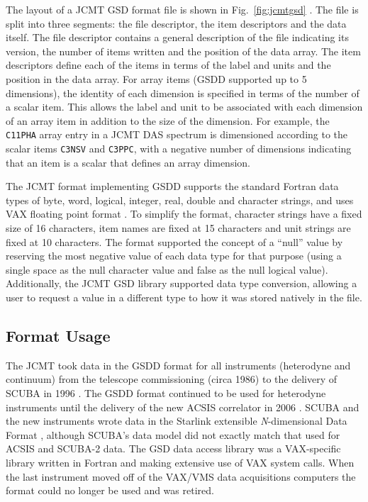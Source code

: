 \documentclass[final,authoryear,5p,times,twocolumn]{elsarticle}
\begin{document}
The layout of a JCMT GSD format file is shown in
Fig.~\ref{fig:jcmtgsd} \citep[see also][]{mtdn84}. The file is split
into three segments: the file descriptor, the item descriptors and the
data itself. The file descriptor contains a general description of the
file indicating its version, the number of items written and the
position of the data array. The item descriptors define each of the
items in terms of the label and units and the position in the data
array. For array items (GSDD supported up to 5 dimensions), the
identity of each dimension is specified in terms of the number of a
scalar item. This allows the label and unit to be associated with each
dimension of an array item in addition to the size of the
dimension. For example, the \texttt{C11PHA} array entry in a JCMT DAS
spectrum \citep{1986SPIE..598..134B} is dimensioned according to the
scalar items \texttt{C3NSV} and \texttt{C3PPC}, with a negative number
of dimensions indicating that an item is a scalar that defines an
array dimension.

The JCMT format implementing GSDD supports the standard Fortran data
types of byte, word, logical, integer, real, double and character
strings, and uses VAX floating point format \citep[see][for more
information on VAX floating point format]{Payne:1980:VFP:641845.641849}. To simplify the format,
character strings have a fixed size of 16 characters, item names are
fixed at 15 characters and unit strings are fixed at 10
characters. The format supported the concept of a ``null'' value by
reserving the most negative value of each data type for that purpose
(using a single space as the null character value and false as the
null logical value). Additionally, the JCMT GSD library supported data
type conversion, allowing a user to request a value in a different
type to how it was stored natively in the file.

\subsection{Format Usage}

The JCMT took data in the GSDD format for all instruments (heterodyne
and continuum) from the telescope commissioning (circa 1986) to the
delivery of SCUBA in 1996 \citep{1999MNRAS.303..659H}. The GSDD format
continued to be used for heterodyne instruments until the delivery of
the new ACSIS correlator in 2006 \citep{2009MNRAS.399.1026B}. SCUBA
and the new instruments wrote data in the Starlink extensible
\emph{N}-dimensional Data Format \citep[NDF;][]{2015NDF}, although
SCUBA's data model did not exactly match that used for ACSIS and
SCUBA-2 \citep{2013MNRAS.430.2513H} data. The GSD data access library
was a VAX-specific library \citep{1986QJRAS..27..675.,mtdn84} written
in Fortran and making extensive use of VAX system calls. When
the last instrument moved off of the VAX/VMS data acquisitions computers
the format could no longer be used and was retired.
\end{document}
